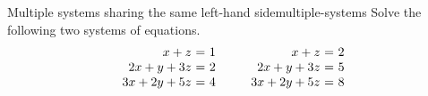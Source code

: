 \begin{example}{Multiple systems sharing the same left-hand side}{multiple-systems}
  Solve the following two systems of equations.
  \begin{equation*}
    \begin{array}{r@{~}c@{~}l@{~}}
      x       +  z &=& 1 \\
      2x +  y + 3z &=& 2 \\
      3x + 2y + 5z &=& 4 \\
    \end{array}
    \quad\quad
    \begin{array}{r@{~}c@{~}l@{~}}
      x       +  z &=& 2 \\
      2x +  y + 3z &=& 5 \\
      3x + 2y + 5z &=& 8 \\
    \end{array}
  \end{equation*}
\end{example}

